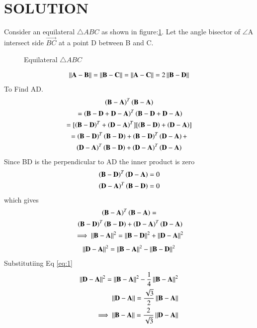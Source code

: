 \documentclass[journal,12pt,twocolumn]{IEEEtran}
\begin{document}
\section{SOLUTION}
Consider an equilateral $\triangle{ABC}$ as shown in figure:\ref{fig:es1}. Let the angle bisector of $\angle$A intersect side $\vec{BC}$ at a point D between B and C.
\renewcommand{\thefigure}{1}
\begin{figure}[!ht]
    \centering
    \resizebox{7cm}{!}{}
    \caption{Equilateral $\triangle{ABC}$}
    \label{fig:es1}
\end{figure}
\begin{align}
    \label{eq:1}\left\lVert\mathbf{A-B}\right\rVert=\left\lVert\mathbf{B-C}\right\rVert=\left\lVert\mathbf{A-C}\right\rVert= 2\left\lVert\mathbf{B-D}\right\rVert
\end{align}
To Find AD.
\begin{multline}
 \brak{\vec{B-A}}^{T}\brak{\vec{B-A}}\\\ =\brak{\vec{B-D+D-A}}^{T}\brak{\vec{B-D+D-A}}\\
 = [\brak{\vec{B-D}}^{T}+\brak{\vec{D-A}}^{T}][\brak{\vec{B-D}}+\brak{\vec{D-A}}]\\
 =\brak{\vec{B-D}}^{T}\brak{\vec{B-D}} + \brak{\vec{B-D}}^{T}\brak{\vec{D-A}} +\\ \brak{\vec{D-A}}^{T}\brak{\vec{B-D}} + \brak{\vec{D-A}}^{T}\brak{\vec{D-A}}
\end{multline}
Since BD is the perpendicular to AD the inner product is zero
\begin{align}
   \left(\mathbf{B-D}\right)^{T}\left(\mathbf{D-A}\right)=0\\ \left(\mathbf{D-A}\right)^{T}\left(\mathbf{B-D}\right) =0
\end{align}
which gives
\begin{multline}
    \brak{\vec{B-A}}^{T}\brak{\vec{B-A}} =\\\ \brak{\vec{B-D}}^{T}\brak{\vec{B-D}} + \brak{\vec{D-A}}^{T}\brak{\vec{D-A}}\\
    \implies\norm{\vec{B-A}}^2=\norm{\vec{B-D}}^2 + \norm{\vec{D-A}}^2
\end{multline} 
\begin{align}
  \left\lVert\mathbf{D-A}\right\rVert^2=\left\lVert\mathbf{B-A}\right\rVert^2-\left\lVert\mathbf{B-D}\right\rVert^2\label{eq:5}
\end{align}
Substitutiing  Eq \eqref{eq:1}
\begin{align}
\left\lVert\mathbf{D-A}\right\rVert^2=\left\lVert\mathbf{B-A}\right\rVert^2-\frac{1}{4}\left\lVert\mathbf{B-A}\right\rVert^2\label{eq:24}\\
 \left\lVert\mathbf{D-A}\right\rVert=\frac{\sqrt{3}}{2}\left\lVert\mathbf{B-A}\right\rVert\\
  \implies\left\lVert\mathbf{B-A}\right\rVert = \frac{2}{\sqrt{3}}\left\lVert\mathbf{D-A}\right\rVert\label{eq:6}
\end{align}
\end{document}
